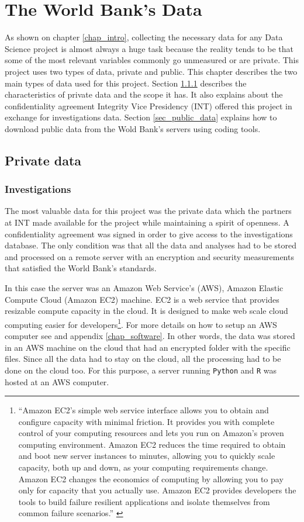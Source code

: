 \chapter{The World Bank's Data}\label{chap_data}

As shown on chapter \ref{chap_intro}, collecting the necessary data for any Data Science project is almost always a huge task because the reality tends to be that some of the most relevant variables commonly go unmeasured or are private. This project uses  two types of data, private and public. This chapter describes the two main types of data used for this project.
Section \ref{sec_inv_data} describes the characteristics of private data and the scope it has. It also explains about the confidentiality agreement Integrity Vice Presidency (INT) offered this project in exchange for investigations data. Section \ref{sec_public_data} explains how to download public data from the Wold Bank's servers using coding tools.

\section{Private data}
\subsection{Investigations} \label{sec_inv_data}

The most valuable data for this project was the private data which the partners at INT made available for the project while maintaining a spirit of openness. A confidentiality agreement was signed in order to give access to the investigations database. The only condition was that all the data and analyses had to be stored and processed on a remote server with an encryption and security measurements that satisfied the World Bank's standards. 

In this case the server was an Amazon Web Service's (AWS), Amazon Elastic Compute Cloud (Amazon EC2) machine. EC2 is a web service that provides resizable compute capacity in the cloud. It is designed to make web scale cloud computing easier for developers\footnote{``Amazon EC2’s simple web service interface allows you to obtain and configure capacity with minimal friction. It provides you with complete control of your computing resources and lets you run on Amazon’s proven computing environment. Amazon EC2 reduces the time required to obtain and boot new server instances to minutes, allowing you to quickly scale capacity, both up and down, as your computing requirements change. Amazon EC2 changes the economics of computing by allowing you to pay only for capacity that you actually use. Amazon EC2 provides developers the tools to build failure resilient applications and isolate themselves from common failure scenarios.'' \parencite{aws_es2}}. For more details on how to setup an AWS computer see \parencite{aws_start} and appendix \ref{chap_software}. In other words, the data was stored in an AWS machine on the cloud that had an encrypted folder with the specific files. Since all the data had to stay on the cloud, all the processing had to be done on the cloud too. For this purpose, a server running \texttt{Python} and \texttt{R} was hosted at an AWS computer. 


